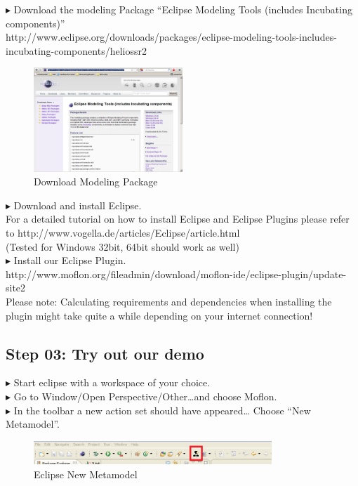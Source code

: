$\blacktriangleright$ Download the modeling Package ``Eclipse Modeling Tools
(includes Incubating components)''\\
http://www.eclipse.org/downloads/packages/eclipse-modeling-tools-includes-incubating-components/heliossr2\\
\begin{figure}[!h]
	\centering
  \includegraphics[width=0.5\textwidth]{pics/eclipse_modelingpackage.png}
	\caption{Download Modeling Package}
\end{figure}

$\blacktriangleright$ Download and install Eclipse.\\
For a detailed tutorial on how to install Eclipse and Eclipse Plugins please
refer to http://www.vogella.de/articles/Eclipse/article.html\\
(Tested for Windows 32bit, 64bit should work as well)\\

$\blacktriangleright$ Install our Eclipse Plugin.\\
http://www.moflon.org/fileadmin/download/moflon-ide/eclipse-plugin/update-site2\\
Please note: Calculating requirements and dependencies when installing the
plugin might take quite a while depending on your internet connection! 

\subsection{Step 03: Try out our demo}
$\blacktriangleright$ Start eclipse with a workspace of your choice.\\

$\blacktriangleright$ Go to Window/Open Perspective/Other\ldots and choose
Moflon.\\

$\blacktriangleright$ In the toolbar a new action set should have appeared\ldots
Choose ``New Metamodel''.\\
\begin{figure}[!h]
	\centering
  \includegraphics[width=0.8\textwidth]{pics/eclipse_metamodelButton.png}
	\caption{Eclipse New Metamodel}
\end{figure}

